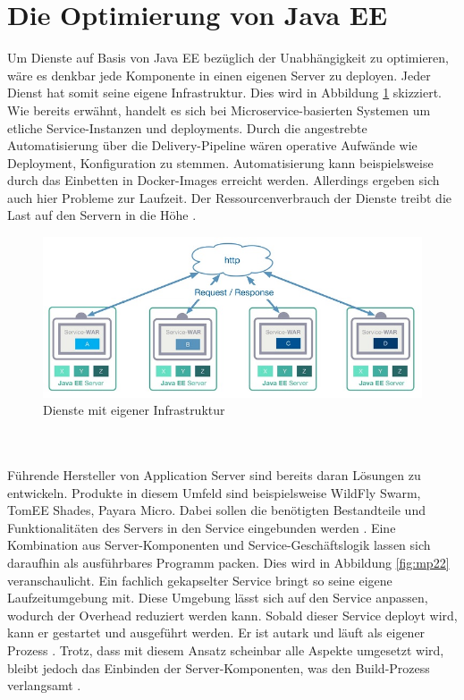 \section{Die Optimierung von Java EE}
Um Dienste auf Basis von Java EE bezüglich der Unabhängigkeit zu optimieren, wäre es denkbar jede Komponente in einen eigenen Server zu deployen. Jeder Dienst hat somit seine eigene Infrastruktur. Dies wird in Abbildung \ref{fig:mp2} skizziert. Wie bereits erwähnt, handelt es sich bei Microservice-basierten Systemen um etliche Service-Instanzen und deployments. Durch die angestrebte Automatisierung über die Delivery-Pipeline wären operative Aufwände wie Deployment, Konfiguration zu stemmen. Automatisierung kann beispielsweise durch das Einbetten in Docker-Images erreicht werden. Allerdings ergeben sich auch hier Probleme zur Laufzeit. Der Ressourcenverbrauch der Dienste treibt die Last auf den Servern in die Höhe \cite{LarsRowekamp.2017d}. 
\begin{figure}[h!]
	\centering
	\includegraphics[width=1.0\linewidth]{images/mp2}
	\caption{Dienste mit eigener Infrastruktur \cite{LarsRowekamp.2017d}}
	\label{fig:mp2}
\end{figure}
\\ \\Führende Hersteller von Application Server sind bereits daran Lösungen zu entwickeln. Produkte in diesem Umfeld sind beispielsweise WildFly Swarm, TomEE Shades, Payara Micro. Dabei sollen die benötigten Bestandteile und Funktionalitäten des Servers in den Service eingebunden werden \cite{jaxcenter.2016}. Eine Kombination aus Server-Komponenten und Service-Geschäftslogik lassen sich daraufhin als ausführbares Programm packen. Dies wird in Abbildung \ref{fig:mp22} veranschaulicht. Ein fachlich gekapselter Service bringt so seine eigene Laufzeitumgebung mit. Diese Umgebung lässt sich auf den Service anpassen, wodurch der Overhead reduziert werden kann. Sobald dieser Service deployt wird, kann er gestartet und ausgeführt werden. Er ist autark und läuft als eigener Prozess \cite{jaxcenter.2016}. Trotz, dass mit diesem Ansatz scheinbar alle Aspekte umgesetzt wird, bleibt jedoch das Einbinden der Server-Komponenten, was den Build-Prozess verlangsamt \cite{LarsRowekamp.2017d}.
